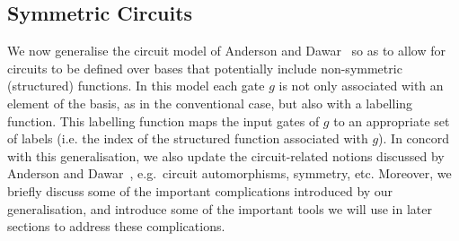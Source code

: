 \documentclass[../paper.tex]{subfiles}
\begin{document}
\subsection{Symmetric Circuits}
We now generalise the circuit model of Anderson and Dawar~\cite{AndersonD17} so
as to allow for circuits to be defined over bases that potentially include
non-symmetric (structured) functions. In this model each gate $g$ is not only
associated with an element of the basis, as in the conventional case, but also
with a labelling function. This labelling function maps the input gates of $g$
to an appropriate set of labels (i.e. the index of the structured function
associated with $g$). In concord with this generalisation, we also update the
circuit-related notions discussed by Anderson and Dawar~\cite{AndersonD17},
e.g.\ circuit automorphisms, symmetry, etc. Moreover, we briefly discuss some of
the important complications introduced by our generalisation, and introduce some
of the important tools we will use in later sections to address these
complications.




\end{document}
